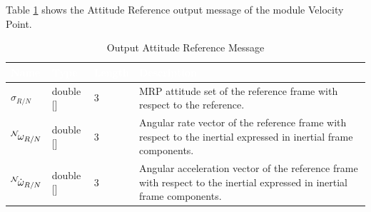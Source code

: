 \documentclass[]{AVSSimReportMemo}
\begin{document}
Table \ref{tab:outputTable} shows the Attitude Reference output message of the module Velocity Point.
\begin{table}[h!]
	\centering
	\caption{Output Attitude Reference Message}
	\begin{tabular}{|l|l|l|p{3in}|}
		\hline
		\rowcolor{BrickRed}
		\textcolor{white}{Name} & \textcolor{white}{Type} & 
		\textcolor{white}{Length} & 
		\textcolor{white}{Description}  \\ \hline
		$\sigma_{R/N}$ & double [] & 3 & 
		MRP attitude set of the reference frame with respect to the reference. \\ \hline
		$\leftexp{N} \omega_{R/N}$ & double [] & 3 & 
		Angular rate vector of the reference frame with respect to the inertial expressed in inertial frame components. \\ \hline
		$\leftexp{N} {\dot{\omega}_{R/N}}$ & double [] & 3 & 
		Angular acceleration vector of the reference frame with respect to the inertial expressed in inertial frame components. \\ \hline
	\end{tabular}
	\label{tab:outputTable}
\end{table}
\newpage
\end{document}
